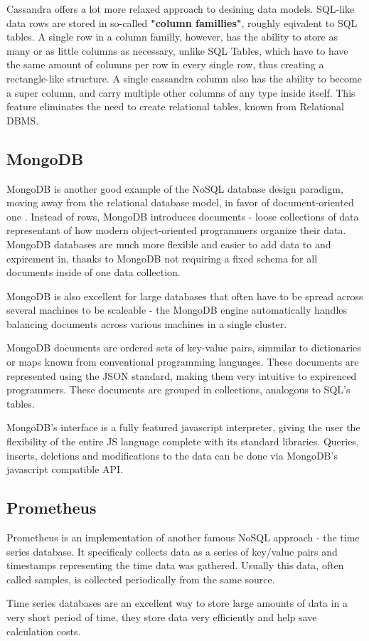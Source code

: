 \par Cassandra offers a lot more relaxed approach to desining data models. SQL-like data rows are stored in so-called \textbf{"column famillies"}, roughly eqivalent to SQL tables. A single row in a column familly, however, has the ability to store as many or as little columns as necessary, unlike SQL Tables, which have to have the same amount of columns per row in every single row, thus creating a rectangle-like structure. A single cassandra column also has the ability to become a super column, and carry multiple other columns of any type inside itself. This feature eliminates the need to create relational tables, known from Relational DBMS.

\subsection{MongoDB}
\label{subsec:background:second_section:second_subsection}
\par MongoDB is another good example of the NoSQL database design paradigm, moving away from the relational database model, in favor of document-oriented one \citep{mongoDB}. Instead of rows, MongoDB introduces documents - loose collections of data representant of how modern object-oriented programmers organize their data. MongoDB databases are much more flexible and easier to add data to and expirement in, thanks to MongoDB not requiring a fixed schema for all documents inside of one data collection.
%
\par MongoDB is also excellent for large databases that often have to be spread across several machines to be scaleable - the MongoDB engine automatically handles balancing documents across various machines in a single cluster. 

\par MongoDB documents are ordered sets of key-value pairs, simmilar to dictionaries or maps known from conventional programming languages. These documents are represented using the JSON standard, making them very intuitive to expirenced programmers. These documents are grouped in collections, analogous to SQL's tables. 

\par MongoDB's interface is a fully featured javascript interpreter, giving the user the flexibility of the entire JS language complete with its standard libraries. Queries, inserts, deletions and modifications to the data can be done via MongoDB's javascript compatible API.

\subsection{Prometheus}
\label{subsec:background:second_section:thrid_subsection}
\par Prometheus is an implementation of another famous NoSQL approach - the time series database. It specificaly collects data as a series of key/value pairs and timestamps representing the time data was gathered. Usually this data, often called samples, is collected periodically from the same source. 
\par Time series databases are an excellent way to store large amounts of data in a very short period of time, they store data very efficiently and help save calculation costs.
